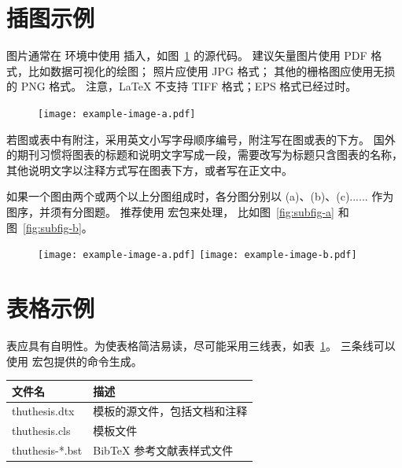 \section{插图示例}

图片通常在  环境中使用  插入，如图~\ref{fig:example} 的源代码。
建议矢量图片使用 PDF 格式，比如数据可视化的绘图；
照片应使用 JPG 格式；
其他的栅格图应使用无损的 PNG 格式。
注意，LaTeX 不支持 TIFF 格式；EPS 格式已经过时。

\begin{figure}
	\centering
	\texttt{[image: example-image-a.pdf]}
	\label{fig:example}
\end{figure}

若图或表中有附注，采用英文小写字母顺序编号，附注写在图或表的下方。
国外的期刊习惯将图表的标题和说明文字写成一段，需要改写为标题只含图表的名称，其他说明文字以注释方式写在图表下方，或者写在正文中。

如果一个图由两个或两个以上分图组成时，各分图分别以 (a)、(b)、(c)...... 作为图序，并须有分图题。
推荐使用  宏包来处理， 比如图~\ref{fig:subfig-a} 和图~\ref{fig:subfig-b}。

\begin{figure}
	\centering
	{\texttt{[image: example-image-a.pdf]}}
	{\texttt{[image: example-image-b.pdf]}}
	\label{fig:multi-image}
\end{figure}



\section{表格示例}

表应具有自明性。为使表格简洁易读，尽可能采用三线表，如表~\ref{tab:three-line}。
三条线可以使用  宏包提供的命令生成。

\begin{table}
	\centering
	\begin{tabular}{ll}
		\toprule
		文件名          & 描述                         \\
		\midrule
		thuthesis.dtx   & 模板的源文件，包括文档和注释 \\
		thuthesis.cls   & 模板文件                     \\
		thuthesis-*.bst & BibTeX 参考文献表样式文件    \\
		\bottomrule
	\end{tabular}
	\label{tab:three-line}
\end{table}

